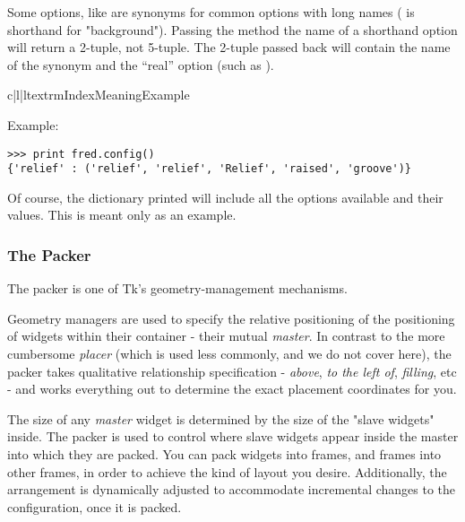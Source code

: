 Some options, like  are synonyms for common options with long
names ( is shorthand for "background"). Passing the
 method the name of a shorthand option will return a
2-tuple, not 5-tuple. The 2-tuple passed back will contain the name of
the synonym and the ``real'' option (such as ).

\begin{tableiii}{c|l|l}{textrm}{Index}{Meaning}{Example}
                         {}
     {}
    {}
                       {}
                       {}
\end{tableiii}


Example:

\begin{verbatim}
>>> print fred.config()
{'relief' : ('relief', 'relief', 'Relief', 'raised', 'groove')}
\end{verbatim}

Of course, the dictionary printed will include all the options
available and their values.  This is meant only as an example.


\subsubsection{The Packer} %

The packer is one of Tk's geometry-management mechanisms.  

Geometry managers are used to specify the relative positioning of the
positioning of widgets within their container - their mutual
\emph{master}.  In contrast to the more cumbersome \emph{placer}
(which is used less commonly, and we do not cover here), the packer
takes qualitative relationship specification - \emph{above}, \emph{to
the left of}, \emph{filling}, etc - and works everything out to
determine the exact placement coordinates for you. 

The size of any \emph{master} widget is determined by the size of
the "slave widgets" inside.  The packer is used to control where slave
widgets appear inside the master into which they are packed.  You can
pack widgets into frames, and frames into other frames, in order to
achieve the kind of layout you desire.  Additionally, the arrangement
is dynamically adjusted to accommodate incremental changes to the
configuration, once it is packed.

